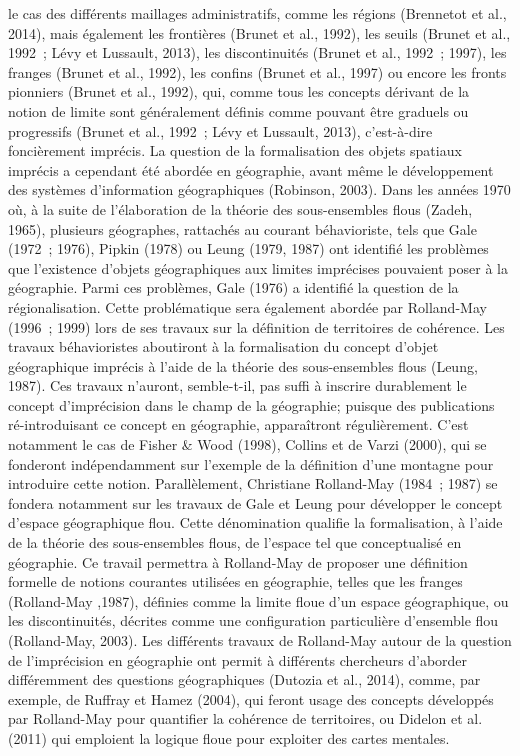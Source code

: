 le cas des différents maillages administratifs, comme les régions
(Brennetot et al., 2014), mais également les frontières (Brunet et
al., 1992), les seuils (Brunet et al., 1992 ; Lévy et Lussault, 2013),
les discontinuités (Brunet et al., 1992 ; 1997), les franges (Brunet
et al., 1992), les confins (Brunet et al., 1997) ou encore les fronts
pionniers (Brunet et al., 1992), qui, comme tous les concepts dérivant
de la notion de limite sont généralement définis comme pouvant être
graduels ou progressifs (Brunet et al., 1992 ; Lévy et Lussault,
2013), c’est-à-dire foncièrement imprécis.  La question de la
formalisation des objets spatiaux imprécis a cependant été abordée en
géographie, avant même le développement des systèmes d’information
géographiques (Robinson, 2003). Dans les années 1970 où, à la suite de
l’élaboration de la théorie des sous-ensembles flous (Zadeh, 1965),
plusieurs géographes, rattachés au courant béhavioriste, tels que Gale
(1972 ; 1976), Pipkin (1978) ou Leung (1979, 1987) ont identifié les
problèmes que l’existence d’objets géographiques aux limites
imprécises pouvaient poser à la géographie. Parmi ces problèmes, Gale
(1976) a identifié la question de la régionalisation. Cette
problématique sera également abordée par Rolland-May (1996 ; 1999)
lors de ses travaux sur la définition de territoires de cohérence. Les
travaux béhavioristes aboutiront à la formalisation du concept d’objet
géographique imprécis à l’aide de la théorie des sous-ensembles flous
(Leung, 1987). Ces travaux n’auront, semble-t-il, pas suffi à inscrire
durablement le concept d’imprécision dans le champ de la géographie;
puisque des publications ré-introduisant ce concept en géographie,
apparaîtront régulièrement. C’est notamment le cas de Fisher \& Wood
(1998), Collins et de Varzi (2000), qui se fonderont indépendamment
sur l’exemple de la définition d’une montagne pour introduire cette
notion.  Parallèlement, Christiane Rolland-May (1984 ; 1987) se
fondera notamment sur les travaux de Gale et Leung pour développer le
concept d’espace géographique flou. Cette dénomination qualifie la
formalisation, à l’aide de la théorie des sous-ensembles flous, de
l’espace tel que conceptualisé en géographie. Ce travail permettra à
Rolland-May de proposer une définition formelle de notions courantes
utilisées en géographie, telles que les franges (Rolland-May ,1987),
définies comme la limite floue d’un espace géographique, ou les
discontinuités, décrites comme une configuration particulière
d’ensemble flou (Rolland-May, 2003). Les différents travaux de
Rolland-May autour de la question de l’imprécision en géographie ont
permit à différents chercheurs d’aborder différemment des questions
géographiques (Dutozia et al., 2014), comme, par exemple, de Ruffray
et Hamez (2004), qui feront usage des concepts développés par
Rolland-May pour quantifier la cohérence de territoires, ou Didelon et
al. (2011) qui emploient la logique floue pour exploiter des cartes
mentales.

